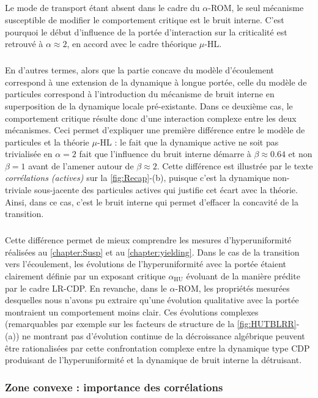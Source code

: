 \subparagraph{}Le mode de transport étant absent dans le cadre du $\alpha$-ROM, le seul mécanisme susceptible de modifier le comportement critique est le bruit interne. C'est pourquoi le début d'influence de la portée d'interaction sur la criticalité est retrouvé à $\alpha \approx 2$, en accord avec le cadre théorique $\mu$-HL.

\subparagraph{}En d'autres termes, alors que la partie concave du modèle d'écoulement correspond à une extension de la dynamique à longue portée, celle du modèle de particules correspond à l'introduction du mécanisme de bruit interne en superposition de la dynamique locale pré-existante. Dans ce deuxième cas, le comportement critique résulte donc d'une interaction complexe entre les deux mécanismes. Ceci permet d'expliquer une première différence entre le modèle de particules et la théorie $\mu$-HL : le fait que la dynamique active ne soit pas trivialisée en $\alpha = 2$ fait que l'influence du bruit interne démarre à $\beta \approx 0.64$ et non $\beta = 1$ avant de l'amener autour de $\beta \approx 2$. Cette différence est illustrée par le texte \textit{corrélations (actives)} sur la \autoref{fig:Recap}-(b), puisque c'est la dynamique non-triviale sous-jacente des particules actives qui justifie cet écart avec la théorie. Ainsi, dans ce cas, c'est le bruit interne qui permet d'effacer la concavité de la transition.

\subparagraph{}Cette différence permet de mieux comprendre les mesures d'hyperuniformité réalisées au \autoref{chapter:Susp} et au \autoref{chapter:yielding}. Dans le cas de la transition vers l'écoulement, les évolutions de l'hyperuniformité avec la portée étaient clairement définie par un exposant critique $\alpha_\text{HU}$ évoluant de la manière prédite par le cadre LR-CDP. En revanche, dans le $\alpha$-ROM, les propriétés mesurées desquelles nous n'avons pu extraire qu'une évolution qualitative avec la portée montraient un comportement moins clair. Ces évolutions complexes (remarquables par exemple sur les facteurs de structure de la \autoref{fig:HUTBLRR}-(a)) ne montrant pas d'évolution continue de la décroissance algébrique peuvent être rationalisées par cette confrontation complexe entre la dynamique type CDP produisant de l'hyperuniformité et la dynamique de bruit interne la détruisant.

\subsubsection{Zone convexe : importance des corrélations}

